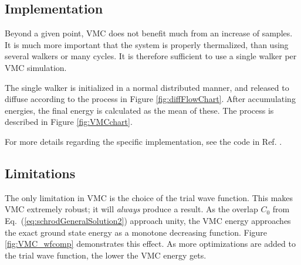 \subsection{Implementation}

Beyond a given point, VMC does not benefit much from an increase of samples. It is much more important that the system is properly thermalized, than using several walkers or many cycles. It is therefore sufficient to use a single walker per VMC simulation.

The single walker is initialized in a normal distributed manner, and released to diffuse according to the process in Figure \ref{fig:diffFlowChart}. After accumulating energies, the final energy is calculated as the mean of these. The process is described in Figure \ref{fig:VMCchart}.

For more details regarding the specific implementation, see the code in Ref. \cite{libBorealisCode}.

\subsection{Limitations}

The only limitation in VMC is the choice of the trial wave function. This makes VMC extremely robust; it will \textit{always} produce a result. As the overlap $C_0$ from Eq.~(\ref{eq:schrodGeneralSolution2}) approach unity, the VMC energy approaches the exact ground state energy as a monotone decreasing function. Figure \ref{fig:VMC_wfcomp} demonstrates this effect. As more optimizations are added to the trial wave function, the lower the VMC energy gets.

